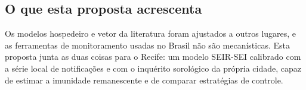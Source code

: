 \subsection{O que esta proposta acrescenta}

Os modelos hospedeiro e vetor da literatura foram ajustados a outros lugares, e as ferramentas de
monitoramento usadas no Brasil não são mecanísticas. Esta proposta junta as duas coisas para o Recife: um
modelo SEIR-SEI calibrado com a série local de notificações e com o inquérito sorológico da própria cidade,
capaz de estimar a imunidade remanescente e de comparar estratégias de controle.
